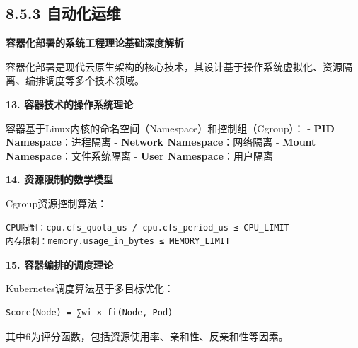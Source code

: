 \subsection{8.5.3 自动化运维}\label{ux81eaux52a8ux5316ux8fd0ux7ef4}

\textbf{容器化部署的系统工程理论基础深度解析}

容器化部署是现代云原生架构的核心技术，其设计基于操作系统虚拟化、资源隔离、编排调度等多个技术领域。

\textbf{13. 容器技术的操作系统理论}

容器基于Linux内核的命名空间（Namespace）和控制组（Cgroup）： - \textbf{PID Namespace}：进程隔离 - \textbf{Network Namespace}：网络隔离 - \textbf{Mount Namespace}：文件系统隔离 - \textbf{User Namespace}：用户隔离

\textbf{14. 资源限制的数学模型}

Cgroup资源控制算法：

\begin{verbatim}
CPU限制：cpu.cfs_quota_us / cpu.cfs_period_us ≤ CPU_LIMIT
内存限制：memory.usage_in_bytes ≤ MEMORY_LIMIT
\end{verbatim}

\textbf{15. 容器编排的调度理论}

Kubernetes调度算法基于多目标优化：

\begin{verbatim}
Score(Node) = ∑wi × fi(Node, Pod)
\end{verbatim}

其中fi为评分函数，包括资源使用率、亲和性、反亲和性等因素。

